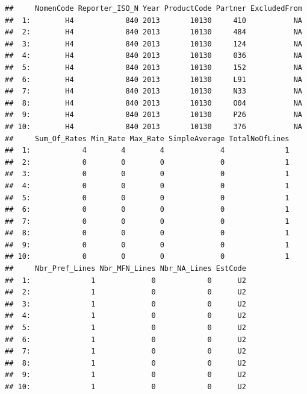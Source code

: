 \documentclass[10pt,]{article}
\begin{document}
\begin{verbatim}
##     NomenCode Reporter_ISO_N Year ProductCode Partner ExcludedFrom
##  1:        H4            840 2013       10130     410           NA
##  2:        H4            840 2013       10130     484           NA
##  3:        H4            840 2013       10130     124           NA
##  4:        H4            840 2013       10130     036           NA
##  5:        H4            840 2013       10130     152           NA
##  6:        H4            840 2013       10130     L91           NA
##  7:        H4            840 2013       10130     N33           NA
##  8:        H4            840 2013       10130     O04           NA
##  9:        H4            840 2013       10130     P26           NA
## 10:        H4            840 2013       10130     376           NA
##     Sum_Of_Rates Min_Rate Max_Rate SimpleAverage TotalNoOfLines
##  1:            4        4        4             4              1
##  2:            0        0        0             0              1
##  3:            0        0        0             0              1
##  4:            0        0        0             0              1
##  5:            0        0        0             0              1
##  6:            0        0        0             0              1
##  7:            0        0        0             0              1
##  8:            0        0        0             0              1
##  9:            0        0        0             0              1
## 10:            0        0        0             0              1
##     Nbr_Pref_Lines Nbr_MFN_Lines Nbr_NA_Lines EstCode
##  1:              1             0            0      U2
##  2:              1             0            0      U2
##  3:              1             0            0      U2
##  4:              1             0            0      U2
##  5:              1             0            0      U2
##  6:              1             0            0      U2
##  7:              1             0            0      U2
##  8:              1             0            0      U2
##  9:              1             0            0      U2
## 10:              1             0            0      U2
\end{verbatim}
\end{document}

